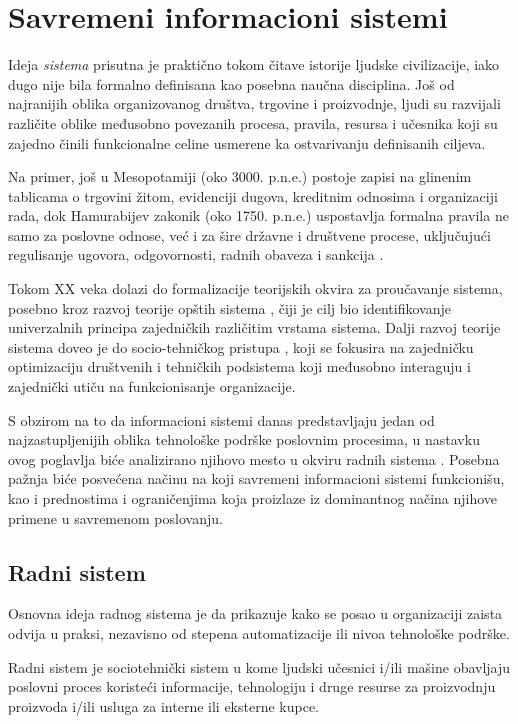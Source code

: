 \chapter{Savremeni informacioni sistemi}\label{sec:uvod}
Ideja \textit{sistema} prisutna je praktično tokom čitave istorije ljudske civilizacije, iako dugo nije bila formalno definisana kao posebna naučna disciplina. Još od najranijih oblika organizovanog društva, trgovine i proizvodnje, ljudi su razvijali različite oblike međusobno povezanih procesa, pravila, resursa i učesnika koji su zajedno činili funkcionalne celine usmerene ka ostvarivanju definisanih ciljeva. 

Na primer, još u Mesopotamiji (oko 3000. p.n.e.) postoje zapisi na glinenim tablicama o trgovini žitom, evidenciji dugova, kreditnim odnosima i organizaciji rada, dok Hamurabijev zakonik (oko 1750. p.n.e.) uspostavlja formalna pravila ne samo za poslovne odnose, već i za šire državne i društvene procese, uključujući regulisanje ugovora, odgovornosti, radnih obaveza i sankcija \cite{carmona2007accounting}.

Tokom XX veka dolazi do formalizacije teorijskih okvira za proučavanje sistema, posebno kroz razvoj teorije opštih sistema \cite{von1974general}, čiji je cilj bio identifikovanje univerzalnih principa zajedničkih različitim vrstama sistema. Dalji razvoj teorije sistema doveo je do socio-tehničkog pristupa \cite{trist1981evolution}, koji se fokusira na zajedničku optimizaciju društvenih i tehničkih podsistema koji međusobno interaguju i zajednički utiču na funkcionisanje organizacije.

S obzirom na to da informacioni sistemi danas predstavljaju jedan od najzastupljenijih oblika tehnološke podrške poslovnim procesima, u nastavku ovog poglavlja biće analizirano njihovo mesto u okviru radnih sistema \cite{alter2008defining}. Posebna pažnja biće posvećena načinu na koji savremeni informacioni sistemi funkcionišu, kao i prednostima i ograničenjima koja proizlaze iz dominantnog načina njihove primene u savremenom poslovanju.

\section{Radni sistem}\label{sec:radni-sistem}
Osnovna ideja radnog sistema je da prikazuje kako se posao u organizaciji zaista odvija u praksi, nezavisno od stepena automatizacije ili nivoa tehnološke podrške.

\begin{definicija}
Radni sistem  \cite{alter1999general} je sociotehnički sistem u kome ljudski učesnici i/ili mašine obavljaju poslovni proces koristeći informacije, tehnologiju i druge resurse za proizvodnju proizvoda i/ili usluga za interne ili eksterne kupce.
\end{definicija}


